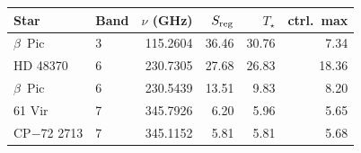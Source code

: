 \begin{tabular}{@{}llrrrr@{}}
\toprule
Star & Band & $\nu$ (GHz) & $S_{\rm reg}$ & $T_\star$ & ctrl.\ max \\
\midrule
$\beta$~Pic & 3 & 115.2604 & 36.46 & 30.76 & 7.34 \\
HD 48370 & 6 & 230.7305 & 27.68 & 26.83 & 18.36 \\
$\beta$~Pic & 6 & 230.5439 & 13.51 & 9.83 & 8.20 \\
61 Vir & 7 & 345.7926 & 6.20 & 5.96 & 5.65 \\
CP$-$72 2713 & 7 & 345.1152 & 5.81 & 5.81 & 5.68 \\
\bottomrule
\end{tabular}
